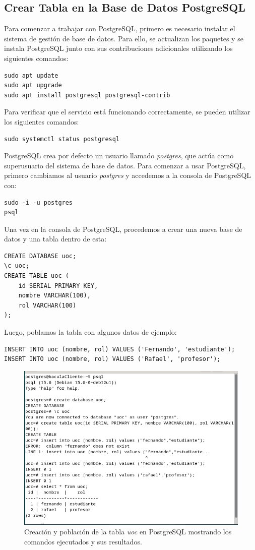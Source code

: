 \subsection{Crear Tabla en la Base de Datos PostgreSQL}

Para comenzar a trabajar con PostgreSQL, primero es necesario instalar el sistema de gestión de base de datos. Para ello, se actualizan los paquetes y se instala PostgreSQL junto con sus contribuciones adicionales utilizando los siguientes comandos:

\begin{verbatim}
sudo apt update
sudo apt upgrade
sudo apt install postgresql postgresql-contrib
\end{verbatim}

Para verificar que el servicio está funcionando correctamente, se pueden utilizar los siguientes comandos:

\begin{verbatim}
sudo systemctl status postgresql
\end{verbatim}

PostgreSQL crea por defecto un usuario llamado \textit{postgres}, que actúa como superusuario del sistema de base de datos. Para comenzar a usar PostgreSQL, primero cambiamos al usuario \textit{postgres} y accedemos a la consola de PostgreSQL con:

\begin{verbatim}
sudo -i -u postgres
psql
\end{verbatim}

Una vez en la consola de PostgreSQL, procedemos a crear una nueva base de datos y una tabla dentro de esta:

\begin{verbatim}
CREATE DATABASE uoc;
\c uoc;
CREATE TABLE uoc (
    id SERIAL PRIMARY KEY,
    nombre VARCHAR(100),
    rol VARCHAR(100)
);
\end{verbatim}

Luego, poblamos la tabla con algunos datos de ejemplo:

\begin{verbatim}
INSERT INTO uoc (nombre, rol) VALUES ('Fernando', 'estudiante');
INSERT INTO uoc (nombre, rol) VALUES ('Rafael', 'profesor');
\end{verbatim}

\begin{figure}[H]
    \centering
    \includegraphics[width=0.5\linewidth]{instalacionBacula/postgrestCrearTabla.png}
    \caption{Creación y población de la tabla \textit{uoc} en PostgreSQL mostrando los comandos ejecutados y sus resultados.}
\end{figure}

